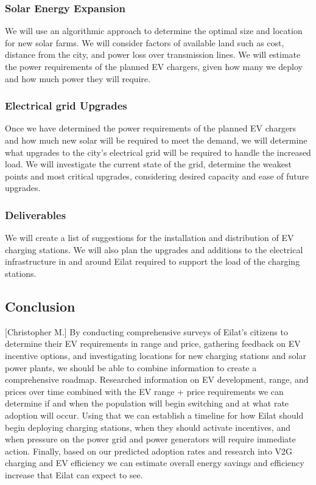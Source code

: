 \documentclass[12pt]{article}                         %
\begin{document}
\subsubsection{Solar Energy Expansion}
 We will use an algorithmic approach to determine the optimal size and location for new solar farms. We will consider factors of available land such as cost, distance from the city, and power loss over transmission lines. We will estimate the power requirements of the planned EV chargers, given how many we deploy and how much power they will require.

\subsubsection{Electrical grid Upgrades}
Once we have determined the power requirements of the planned EV chargers and how much new solar will be required to meet the demand, we will determine what upgrades to the city's electrical grid will be required to handle the increased load. We will investigate the current state of the grid, determine the weakest points and most critical upgrades, considering desired capacity and ease of future upgrades. 

\subsubsection{Deliverables}
We will create a list of suggestions for the installation and distribution of EV charging stations. We will also plan the upgrades and additions to the electrical infrastructure in and around Eilat required to support the load of the charging stations.

\subsection{Conclusion}[Christopher M.]
By conducting comprehensive surveys of Eilat's citizens to determine their EV requirements in range and price, gathering feedback on EV incentive options, and investigating locations for new charging stations and solar power plants, we should be able to combine information to create a comprehensive roadmap. Researched information on EV development, range, and prices over time combined with the EV range + price requirements we can determine if and when the population will begin switching and at what rate adoption will occur. Using that we can establish a timeline for how Eilat should begin deploying charging stations, when they should activate incentives, and when pressure on the power grid and power generators will require immediate action. Finally, based on our predicted adoption rates and research into V2G charging and EV efficiency we can estimate overall energy savings and efficiency increase that Eilat can expect to see.

\newpage


\end{document}
